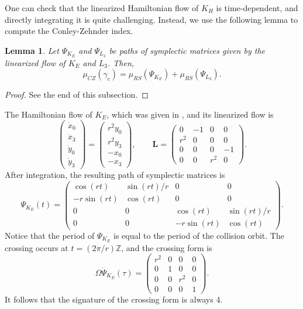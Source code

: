 \documentclass{amsart}
\newcommand{\Z}{\mathbb{Z}}
\newcommand{\g}{\gamma}
\newtheorem{lmm}[thm]{Lemma}
\begin{document}
One can check that the linearized Hamiltonian flow of $K_H$ is time-dependent, and directly integrating it is quite challenging.
Instead, we use the following lemma to compute the Conley-Zehnder index.
\begin{lmm}\label{Lemma - Decomposition of Index}
	Let $\Psi_{K_E}$ and $\Psi_{L_3}$ be paths of symplectic matrices given by the linearized flow of $K_E$ and $L_3$.
	Then,
	$$
	\mu_{CZ}(\g_c) = \mu_{RS}(\Psi_{K_E}) + \mu_{RS}(\Psi_{L_3}).
	$$
\end{lmm}
\begin{proof}
	See the end of this subsection.
\end{proof}

The Hamiltonian flow of $K_E$, which was given in , and its linearized flow is
$$
\begin{pmatrix}
	\dot{x}_0\\
	\dot{x}_3\\
	\dot{y}_0\\
	\dot{y}_3
\end{pmatrix}
=
\begin{pmatrix}
	r^2 y_0\\
	r^2 y_3\\
	- x_0\\
	-x_3
\end{pmatrix},
\qquad
\mathbf{L} = \begin{pmatrix}
	0&-1&0&0\\
	r^2&0&0&0\\
	0&0&0&-1\\
	0&0&r^2&0
\end{pmatrix}.
$$
After integration, the resulting path of symplectic matrices is
$$
\Psi_{K_E}(t)=\begin{pmatrix}
	\cos(rt)&\sin(rt)/r&0&0\\
	-r\sin(rt)&\cos(rt)&0&0\\
	0&0&\cos(rt)&\sin(rt)/r\\
	0&0&-r\sin(rt)&\cos(rt)
\end{pmatrix}.
$$
Notice that the period of $\Psi_{K_E}$ is equal to the period of the collision orbit.
The crossing occurs at $t=(2\pi/r)\Z$, and the crossing form is
$$
\Omega\dot{\Psi}_{K_E}(\tau) = \begin{pmatrix}
	r^2&0&0&0\\
	0&1&0&0\\
	0&0&r^2&0\\
	0&0&0&1
\end{pmatrix}.
$$
It follows that the signature of the crossing form is always 4.
\end{document}

